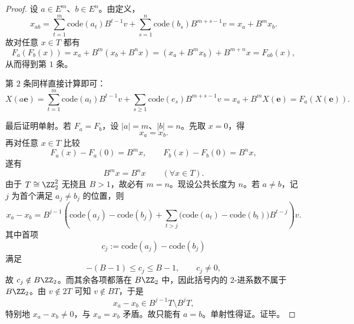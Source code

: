 \begin{proof}
设 \(a\in E^m\)、\(b\in E^n\)。由定义，
\[
x_{ab}
=
\sum_{t=1}^{m}\mathrm{code}(a_t)B^{t-1}v
+
\sum_{s=1}^{n}\mathrm{code}(b_s)B^{m+s-1}v
=
x_a+B^m x_b.
\]
故对任意 \(x\in T\) 都有
\[
F_a(F_b(x))
=
x_a+B^m(x_b+B^n x)
=
(x_a+B^m x_b)+B^{m+n}x
=
F_{ab}(x),
\]
从而得到第 \(1\) 条。

第 \(2\) 条同样直接计算即可：
\[
X(a\mathbf e)
=
\sum_{t=1}^{m}\mathrm{code}(a_t)B^{t-1}v
+
\sum_{s\ge 1}\mathrm{code}(e_s)B^{m+s-1}v
=
x_a+B^m X(\mathbf e)
=
F_a(X(\mathbf e)).
\]

最后证明单射。若 \(F_a=F_b\)，设 \(|a|=m\)、\(|b|=n\)。先取 \(x=0\)，得
\[
x_a=x_b.
\]
再对任意 \(x\in T\) 比较
\[
F_a(x)-F_a(0)=B^m x,
\qquad
F_b(x)-F_b(0)=B^n x,
\]
遂有
\[
B^m x=B^n x
\qquad(\forall x\in T).
\]
由于 \(T\cong \ZZ_2^2\) 无挠且 \(B>1\)，故必有 \(m=n\)。现设公共长度为 \(n\)。若 \(a\neq b\)，记 \(j\) 为首个满足 \(a_j\neq b_j\) 的位置，则
\[
x_a-x_b
=
B^{j-1}
\left(
\mathrm{code}(a_j)-\mathrm{code}(b_j)
+
\sum_{t>j}\bigl(\mathrm{code}(a_t)-\mathrm{code}(b_t)\bigr)B^{t-j}
\right)v.
\]
其中首项
\[
c_j:=\mathrm{code}(a_j)-\mathrm{code}(b_j)
\]
满足
\[
-(B-1)\le c_j\le B-1,
\qquad
c_j\neq 0,
\]
故 \(c_j\notin B\ZZ_2\)。而其余各项都落在 \(B\ZZ_2\) 中，因此括号内的 \(2\)-进系数不属于 \(B\ZZ_2\)。由 \(v\notin 2T\) 可知 \(v\notin BT\)，于是
\[
x_a-x_b\in B^{j-1}T\setminus B^jT,
\]
特别地 \(x_a-x_b\neq 0\)，与 \(x_a=x_b\) 矛盾。故只能有 \(a=b\)。单射性得证。证毕。
\end{proof}

